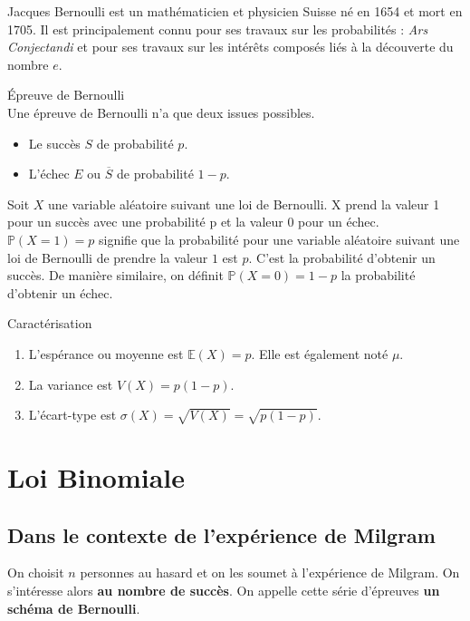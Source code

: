 \documentclass[paper=a4, fontsize=9pt]{scrartcl} %
\begin{document}
Jacques Bernoulli est un mathématicien et physicien Suisse né en 1654 et mort en 1705. Il est principalement connu pour ses travaux sur les probabilités : \textit{Ars Conjectandi} et pour ses travaux sur les intérêts composés liés à la découverte du nombre $e$.

\begin{Definition}{Épreuve de Bernoulli}\\
  Une épreuve de Bernoulli n'a que deux issues possibles.
  \begin{itemize}
  \item Le succès $S$ de probabilité $p$.
  \item L'échec $E$ ou $\overline{S}$ de probabilité $1-p$.
  \end{itemize}
\end{Definition}

Soit $X$ une variable aléatoire suivant une loi de Bernoulli. X prend la valeur 1 pour un succès avec une probabilité p et la valeur 0 pour un échec.\\

$\mathbb{P}(X = 1) = p$ signifie que la probabilité pour une variable aléatoire suivant une loi de Bernoulli de prendre la valeur $1$ est $p$. C'est la probabilité d'obtenir un succès. De manière similaire, on définit $\mathbb{P}(X = 0) = 1-p$ la probabilité d'obtenir un échec.

\begin{Proposition}{Caractérisation}
  \begin{enumerate}
  \item L'espérance ou moyenne est $\mathbb{E}(X) = p$. Elle est également noté $\mu$.
  \item La variance est $V(X)  = p (1-p)$.
  \item L'écart-type est $\sigma(X) = \sqrt{V(X)} = \sqrt{p(1-p)}$.
  \end{enumerate}
\end{Proposition}

\newpage
\section{Loi Binomiale}

\subsection{Dans le contexte de l'expérience de Milgram}

On choisit $n$ personnes au hasard et on les soumet à l'expérience de Milgram. On s'intéresse alors \textbf{au nombre de succès}. On appelle cette série d'épreuves \textbf{un schéma de Bernoulli}.
\end{document}
